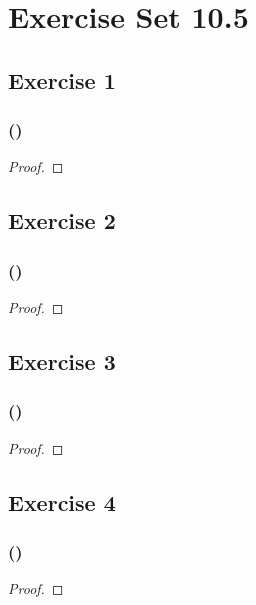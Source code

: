 \documentclass[14pt]{extarticle}
\begin{document}
\section{Exercise Set 10.5}
\subsection{Exercise 1}

\subsubsection{()}

\begin{proof}

\end{proof}

\subsection{Exercise 2}

\subsubsection{()}

\begin{proof}

\end{proof}

\subsection{Exercise 3}

\subsubsection{()}

\begin{proof}

\end{proof}

\subsection{Exercise 4}

\subsubsection{()}

\begin{proof}

\end{proof}
\end{document}
